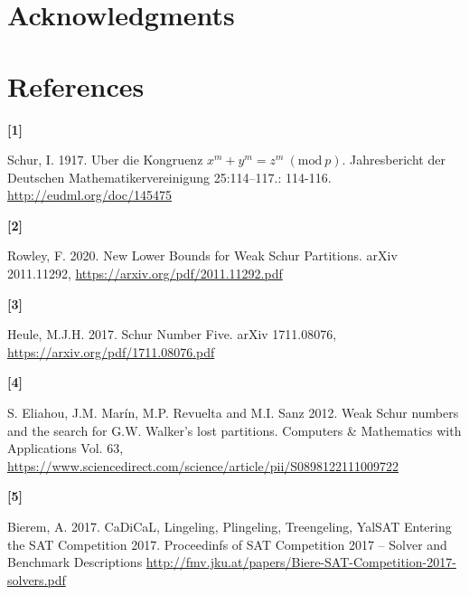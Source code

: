 \documentclass{article}
\newtheorem{computational theorem}{Computational Theorem}[theorem]
\begin{document}
\section{Acknowledgments}



\section{References}

\hypertarget{label1}{\textbf{[1]}} Schur, I. 1917. Uber die Kongruenz \(x^m + y^m = z^m~(\text{mod}~p)\). Jahresbericht der 
Deutschen Mathematikervereinigung 25:114–117.: 114-116. \url{http://eudml.org/doc/145475}

\hypertarget{label2}{\textbf{[2]}} Rowley, F. 2020. New Lower Bounds for Weak Schur Partitions. arXiv 2011.11292, 
\url{https://arxiv.org/pdf/2011.11292.pdf}

\hypertarget{label3}{\textbf{[3]}} Heule, M.J.H. 2017. Schur Number Five. arXiv 1711.08076, \url{https://arxiv.org/pdf/1711.08076.pdf}

\hypertarget{label4}{\textbf{[4]}} S. Eliahou, J.M. Marín, M.P. Revuelta and M.I. Sanz 2012. Weak Schur numbers and the search for G.W. 
Walker’s lost partitions. Computers \& Mathematics with Applications Vol. 63, \url{https://www.sciencedirect.com/science/article/pii/S0898122111009722}

\hypertarget{label5}{\textbf{[5]}} Bierem, A. 2017. CaDiCaL, Lingeling, Plingeling, Treengeling, YalSAT Entering the SAT Competition 2017. 
Proceedinfs of SAT Competition 2017 -- Solver and Benchmark Descriptions \url{http://fmv.jku.at/papers/Biere-SAT-Competition-2017-solvers.pdf}
\end{document}
